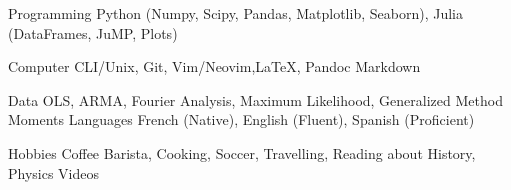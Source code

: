 

\begin{cvskills}

	\cvskill
	{Programming} %
	{Python (Numpy, Scipy, Pandas, Matplotlib, Seaborn), Julia (DataFrames, JuMP, Plots)}  %

	\cvskill
	{Computer}
	{CLI/Unix, Git, Vim/Neovim,\LaTeX, Pandoc Markdown}

	\cvskill
	{Data}
	{OLS, ARMA, Fourier Analysis, Maximum Likelihood, Generalized Method Moments}
	\cvskill
	{Languages} %
	{French (Native), English (Fluent), Spanish (Proficient)} %

	\cvskill
	{Hobbies}
	{Coffee Barista, Cooking, Soccer, Travelling, Reading about History, Physics Videos}
\end{cvskills}

